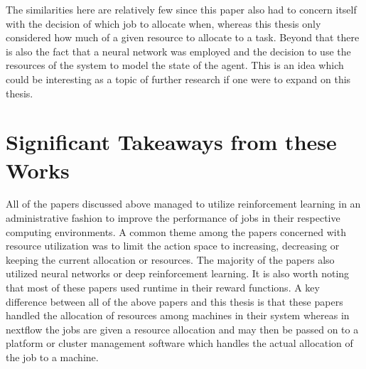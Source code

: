 The similarities here are relatively few since this paper also had to concern itself with the decision of which job to allocate when, whereas this thesis only considered how much of a given resource to allocate to a task. Beyond that there is also the fact that a neural network was employed and the decision to use the resources of the system to model the state of the agent. This is an idea which could be interesting as a topic of further research if one were to expand on this thesis.

\section{Significant Takeaways from these Works}
\label{sec:takeaways}

All of the papers discussed above managed to utilize reinforcement learning in an administrative fashion to improve the performance of jobs in their respective computing environments. A common theme among the papers concerned with resource utilization was to limit the action space to increasing, decreasing or keeping the current allocation or resources. The majority of the papers also utilized neural networks or deep reinforcement learning. It is also worth noting that most of these papers used runtime in their reward functions. A key difference between all of the above papers and this thesis is that these papers handled the allocation of resources among machines in their system whereas in nextflow the jobs are given a resource allocation and may then be passed on to a platform or cluster management software which handles the actual allocation of the job to a machine. 


